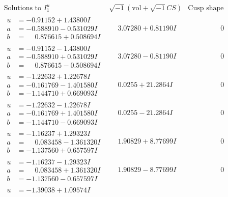 \documentclass[1p]{elsarticle_modified}
\theoremstyle{definition}
\newcommand{\I}{\sqrt{-1}}
\begin{document}
$$\begin{array}{c|c|c}
\text{Solutions to }I^u_{1}& \I (\text{vol} + \sqrt{-1}CS) & \text{Cusp shape}\\
 \hline 
\begin{aligned}
u &= -0.91152 + 1.43800 I \\
a &= -0.588910 - 0.531029 I \\
b &= \phantom{-}0.876615 + 0.508694 I\end{aligned}
 & \phantom{-}3.07280 + 0.81190 I & \phantom{-0.000000 } 0 \\ \hline\begin{aligned}
u &= -0.91152 - 1.43800 I \\
a &= -0.588910 + 0.531029 I \\
b &= \phantom{-}0.876615 - 0.508694 I\end{aligned}
 & \phantom{-}3.07280 - 0.81190 I & \phantom{-0.000000 } 0 \\ \hline\begin{aligned}
u &= -1.22632 + 1.22678 I \\
a &= -0.161769 - 1.401580 I \\
b &= -1.144710 + 0.669093 I\end{aligned}
 & \phantom{-}0.0255 + 21.2864 I & \phantom{-0.000000 } 0 \\ \hline\begin{aligned}
u &= -1.22632 - 1.22678 I \\
a &= -0.161769 + 1.401580 I \\
b &= -1.144710 - 0.669093 I\end{aligned}
 & \phantom{-}0.0255 - 21.2864 I & \phantom{-0.000000 } 0 \\ \hline\begin{aligned}
u &= -1.16237 + 1.29323 I \\
a &= \phantom{-}0.083458 - 1.361320 I \\
b &= -1.137560 + 0.657597 I\end{aligned}
 & \phantom{-}1.90829 + 8.77699 I & \phantom{-0.000000 } 0 \\ \hline\begin{aligned}
u &= -1.16237 - 1.29323 I \\
a &= \phantom{-}0.083458 + 1.361320 I \\
b &= -1.137560 - 0.657597 I\end{aligned}
 & \phantom{-}1.90829 - 8.77699 I & \phantom{-0.000000 } 0 \\ \hline\begin{aligned}
u &= -1.39038 + 1.09574 I \\

\end{aligned}
\end{array}$$
\end{document}
